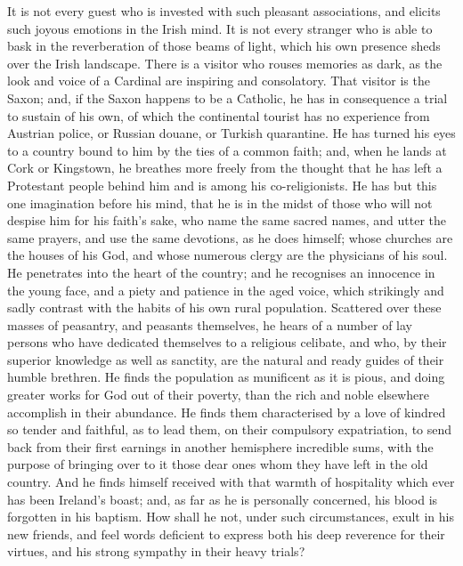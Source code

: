 It is not every guest who is
invested with such pleasant associations, and elicits such joyous
emotions in the Irish mind. It is not every stranger who is able to
bask in the reverberation of those beams of light, which his own
presence sheds over the Irish landscape. There is a visitor who rouses
memories as dark, as the look and voice of a Cardinal are inspiring
and consolatory. That visitor is the Saxon; and, if the Saxon happens
to be a Catholic, he has in consequence a trial to sustain of his own,
of which the continental tourist has no experience from Austrian
police, or Russian douane, or Turkish quarantine. He has turned his
eyes to a country bound to him by the ties of a common faith; and,
when he lands at Cork or Kingstown, he breathes more freely from the
thought that he has left a Protestant people behind him and is among
his co-religionists. He has but this one imagination before his mind,
that he is in the midst of those who will not despise him for his
faith's sake, who name the same sacred names, and utter the same
prayers, and use the same devotions, as he does himself; whose
churches are the houses of his God, and whose numerous clergy are the
physicians of his soul. He penetrates into the heart of the country;
and he recognises an innocence in the young face, and a piety and patience in the aged voice, which strikingly and sadly contrast
with the habits of his own rural population. Scattered over these
masses of peasantry, and peasants themselves, he hears of a number of
lay persons who have dedicated themselves to a religious celibate, and
who, by their superior knowledge as well as sanctity, are the natural
and ready guides of their humble brethren. He finds the population as
munificent as it is pious, and doing greater works for God out of
their poverty, than the rich and noble elsewhere accomplish in their
abundance. He finds them characterised by a love of kindred so tender
and faithful, as to lead them, on their compulsory expatriation, to
send back from their first earnings in another hemisphere incredible
sums, with the purpose of bringing over to it those dear ones whom
they have left in the old country. And he finds himself received with
that warmth of hospitality which ever has been Ireland's boast; and,
as far as he is personally concerned, his blood is forgotten in his
baptism. How shall he not, under such circumstances, exult in his new
friends, and feel words deficient to express both his deep reverence
for their virtues, and his strong sympathy in their heavy trials?

